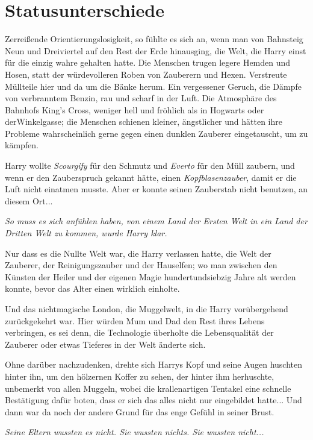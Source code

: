 \chapter{Statusunterschiede}

Zerreißende Orientierungslosigkeit, so fühlte es sich an, wenn man von Bahnsteig
Neun und Dreiviertel auf den Rest der Erde hinausging, die Welt, die Harry einst
für die einzig wahre gehalten hatte. Die Menschen trugen legere Hemden und
Hosen, statt der würdevolleren Roben von Zauberern und Hexen. Verstreute
Müllteile hier und da um die Bänke herum. Ein vergessener Geruch, die Dämpfe von
verbranntem Benzin, rau und scharf in der Luft. Die Atmosphäre des Bahnhofs
King's Cross, weniger hell und fröhlich als in Hogwarts oder derWinkelgasse; die
Menschen schienen kleiner, ängstlicher und hätten ihre Probleme wahrscheinlich
gerne gegen einen dunklen Zauberer eingetauscht, um zu kämpfen.

Harry wollte \glqq \emph{Scourgify}\grqq{} für den Schmutz und \glqq
\emph{Everto}\grqq{} für den Müll zaubern, und wenn er den Zauberspruch gekannt
hätte, einen \glqq \emph{Kopfblasenzauber}\grqq{}, damit er die Luft nicht
einatmen musste. Aber er konnte seinen Zauberstab nicht benutzen, an diesem
Ort...

\emph{So muss es sich anfühlen haben, von einem Land der Ersten Welt in ein Land der Dritten Welt zu kommen, wurde Harry klar.}

Nur dass es die Nullte Welt war, die Harry verlassen hatte, die Welt der
Zauberer, der Reinigungszauber und der Hauselfen; wo man zwischen den Künsten
der Heiler und der eigenen Magie hundertundsiebzig Jahre alt werden konnte,
bevor das Alter einen wirklich einholte.

Und das nichtmagische London, die Muggelwelt, in die Harry vorübergehend
zurückgekehrt war. Hier würden Mum und Dad den Rest ihres Lebens verbringen, es
sei denn, die Technologie überholte die Lebensqualität der Zauberer oder etwas
Tieferes in der Welt änderte sich.

Ohne darüber nachzudenken, drehte sich Harrys Kopf und seine Augen huschten
hinter ihn, um den hölzernen Koffer zu sehen, der hinter ihm herhuschte,
unbemerkt von allen Muggeln, wobei die krallenartigen Tentakel eine schnelle
Bestätigung dafür boten, dass er sich das alles nicht nur eingebildet hatte...
Und dann war da noch der andere Grund für das enge Gefühl in seiner Brust.

\emph{Seine Eltern wussten es nicht. Sie wussten nichts. Sie wussten nicht...}

